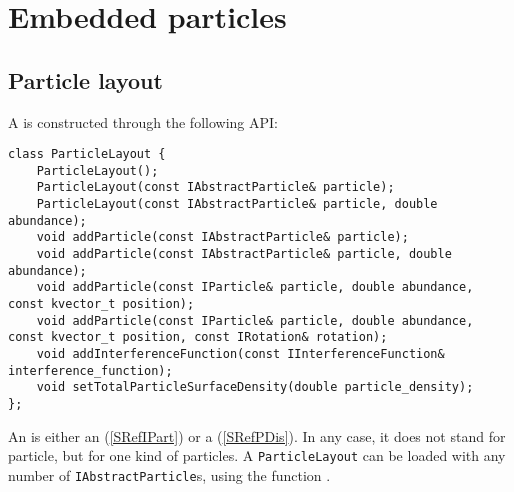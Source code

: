 
\chapter{Embedded particles}\label{SRefParticles}

\section{Particle layout}\label{SRefPLay}

A  is constructed through the following API:

\setCpp
\begin{lstlisting}
class ParticleLayout {
    ParticleLayout();
    ParticleLayout(const IAbstractParticle& particle);
    ParticleLayout(const IAbstractParticle& particle, double abundance);
    void addParticle(const IAbstractParticle& particle);
    void addParticle(const IAbstractParticle& particle, double abundance);
    void addParticle(const IParticle& particle, double abundance, const kvector_t position);
    void addParticle(const IParticle& particle, double abundance, const kvector_t position, const IRotation& rotation);
    void addInterferenceFunction(const IInterferenceFunction& interference_function);
    void setTotalParticleSurfaceDensity(double particle_density);
};
\end{lstlisting}

An  is either an  (\cref{SRefIPart})
or a  (\cref{SRefPDis}).
%
%
%
In any case, it does not stand for  particle,
but for one kind of particles.
A \texttt{ParticleLayout} can be loaded with any number of \texttt{IAbstractParticle}s,
using the function .

